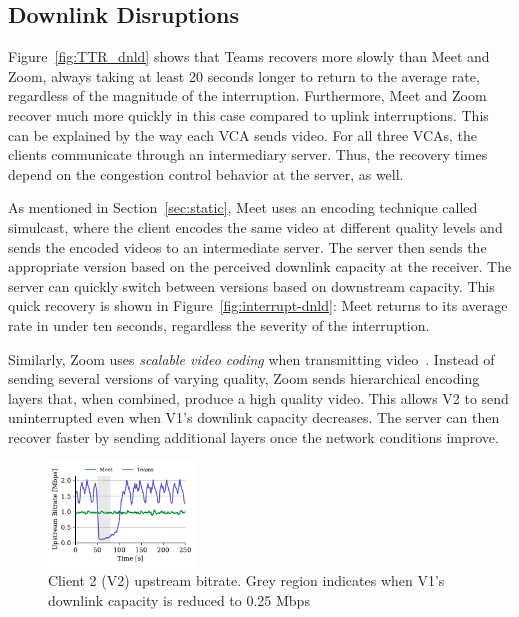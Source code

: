 \subsection{Downlink Disruptions}

Figure~\ref{fig:TTR_dnld} shows that Teams recovers more slowly than Meet and
Zoom, always taking at least 20 seconds longer to return to the average rate,
regardless of the magnitude of the interruption. Furthermore, Meet and Zoom
recover much more quickly in this case compared to uplink interruptions. This
can be explained by the way each VCA sends video. For all three VCAs, the
clients communicate through an intermediary server. Thus, the recovery times
depend on the congestion control behavior at the server, as well. 

As mentioned in Section~\ref{sec:static}, Meet uses an encoding technique
called simulcast, where the client encodes the same video at different quality
levels and sends the encoded videos to an intermediate server. The server then
sends the appropriate version based on the perceived downlink capacity at the
receiver. The server can quickly switch between versions based on downstream
capacity. This quick recovery is shown in
Figure~\ref{fig:interrupt-dnld}: Meet returns to its average rate in under ten
seconds, regardless the severity of the interruption.

Similarly, Zoom uses \textit{scalable video coding} when transmitting
video~\cite{zoom_encoding}. Instead of sending several versions of varying
quality, Zoom sends hierarchical encoding layers that, when combined,
produce a high quality video. This allows V2 to send uninterrupted
even when V1's downlink capacity decreases. The server can then recover faster
by sending additional layers once the network conditions improve.  

\begin{figure}[t]
    \centering
    \includegraphics[width=0.35\textwidth,keepaspectratio]{../figures/interrupt/Interrupt-sender.pdf}
    \caption{Client 2 (V2) upstream bitrate. Grey region indicates when V1's downlink capacity is reduced to 0.25 Mbps}
    \label{fig:interrupt-sender}
\end{figure}

